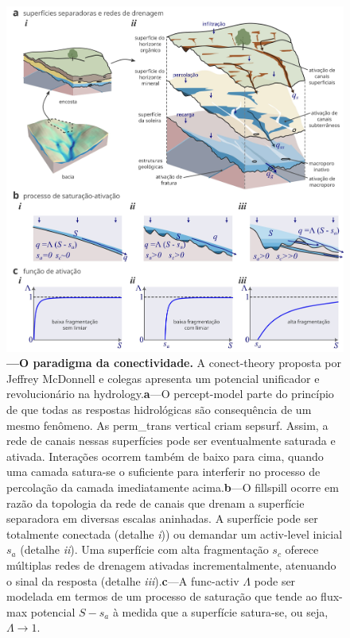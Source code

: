 \documentclass[./main.tex]{subfiles}
\begin{document}
\begin{figure}[t!] 
\centering				
\includegraphics[width=0.98\linewidth]{figs/fig_connect.jpg}		
\caption[O \gls{paradigma} da conectividade]
{\textbf{---\;O \gls{paradigma} da conectividade.} A \gls{conect-theory} proposta por Jeffrey McDonnell e colegas apresenta um potencial unificador e revolucionário na \gls{hydrology}.\;\textbf{a}\;---\;O \gls{percept-model} parte do princípio de que todas as respostas hidrológicas são consequência de um mesmo fenômeno. As \gls{perm_trans} vertical criam \gls{sepsurf}. Assim, a rede de canais nessas superfícies pode ser eventualmente saturada e ativada. Interações ocorrem também de baixo para cima, quando uma camada satura-se o suficiente para interferir no processo de percolação da camada imediatamente acima.\;\textbf{b}\;---\;O \gls{fillspill} ocorre em razão da topologia da rede de canais que drenam a superfície separadora em diversas escalas aninhadas. A superfície pode ser totalmente conectada (detalhe \textrm{\textit{i}})) ou demandar um \gls{activ-level} inicial $s_a$ (detalhe \textrm{\textit{ii}}). Uma superfície com alta fragmentação $s_c$ oferece múltiplas redes de drenagem ativadas incrementalmente, atenuando o sinal da resposta (detalhe \textrm{\textit{iii}}).\;\textbf{c}\;---\;A \gls{func-activ} $\Lambda$ pode ser modelada em termos de um processo de saturação que tende ao \gls{flux-max} potencial $S - s_a$ à medida que a superfície satura-se, ou seja, $\Lambda \rightarrow 1$.    
}
\label{fig:connnect} 		
\end{figure}
\end{document}
